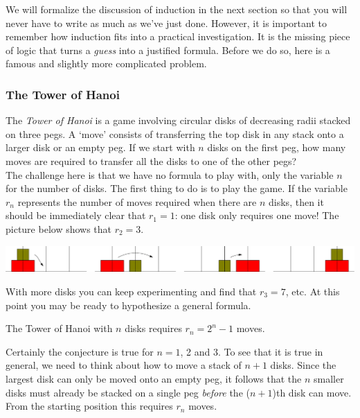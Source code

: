 We will formalize the discussion of induction in the next section so that you will never have to write as much as we've just done. However, it is important to remember how induction fits into a practical investigation. It is the missing piece of logic that turns a \emph{guess} into a justified formula. Before we do so, here is a famous and slightly more complicated problem.


\subsubsection*{The Tower of Hanoi}

The \emph{Tower of Hanoi} is a game involving circular disks of decreasing radii stacked on three pegs. A `move' consists of transferring the top disk in any stack onto a larger disk or an empty peg. If we start with $n$ disks on the first peg, how many moves are required to transfer all the disks to one of the other pegs?\\

The challenge here is that we have no formula to play with, only the variable $n$ for the number of disks. The first thing to do is to play the game. If the variable $r_n$ represents the number of moves required when there are $n$ disks, then it should be immediately clear that $r_1=1$: one disk only requires one move! The picture below shows that $r_2=3$.
\begin{center}
\includegraphics[width=\textwidth]{induction-03-hanoi2}
\end{center}

With more disks you can keep experimenting and find that $r_3=7$, etc. At this point you may be ready to hypothesize a general formula.

\begin{conj}\label{conj:hanoi}
The Tower of Hanoi with $n$ disks requires $r_n=2^n-1$ moves.
\end{conj}


Certainly the conjecture is true for $n=1$, 2 and 3. To see that it is true in general, we need to think about how to move a stack of $n+1$ disks. Since the largest disk can only be moved onto an empty peg, it follows that the $n$ smaller disks must already be stacked on a single peg \emph{before} the ($n+1$)th disk can move. From the starting position this requires $r_n$ moves.

